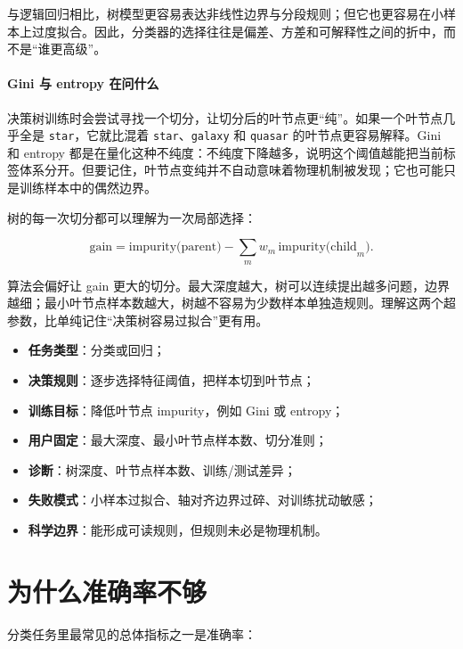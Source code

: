 与逻辑回归相比，树模型更容易表达非线性边界与分段规则；但它也更容易在小样本上过度拟合。因此，分类器的选择往往是偏差、方差和可解释性之间的折中，而不是“谁更高级”。

\paragraph{Gini 与 entropy 在问什么}

决策树训练时会尝试寻找一个切分，让切分后的叶节点更“纯”。如果一个叶节点几乎全是 \texttt{star}，它就比混着 \texttt{star}、\texttt{galaxy} 和 \texttt{quasar} 的叶节点更容易解释。Gini 和 entropy 都是在量化这种不纯度：不纯度下降越多，说明这个阈值越能把当前标签体系分开。但要记住，叶节点变纯并不自动意味着物理机制被发现；它也可能只是训练样本中的偶然边界。

树的每一次切分都可以理解为一次局部选择：

\[
\text{gain}
=
\text{impurity(parent)}
-
\sum_m w_m\,\text{impurity(child}_m\text{)}.
\]

算法会偏好让 gain 更大的切分。最大深度越大，树可以连续提出越多问题，边界越细；最小叶节点样本数越大，树越不容易为少数样本单独造规则。理解这两个超参数，比单纯记住“决策树容易过拟合”更有用。

\begin{examplebox}
\begin{itemize}
    \item \textbf{任务类型}：分类或回归；
    \item \textbf{决策规则}：逐步选择特征阈值，把样本切到叶节点；
    \item \textbf{训练目标}：降低叶节点 impurity，例如 Gini 或 entropy；
    \item \textbf{用户固定}：最大深度、最小叶节点样本数、切分准则；
    \item \textbf{诊断}：树深度、叶节点样本数、训练/测试差异；
    \item \textbf{失败模式}：小样本过拟合、轴对齐边界过碎、对训练扰动敏感；
    \item \textbf{科学边界}：能形成可读规则，但规则未必是物理机制。
\end{itemize}
\end{examplebox}

\section{为什么准确率不够}

分类任务里最常见的总体指标之一是准确率：

